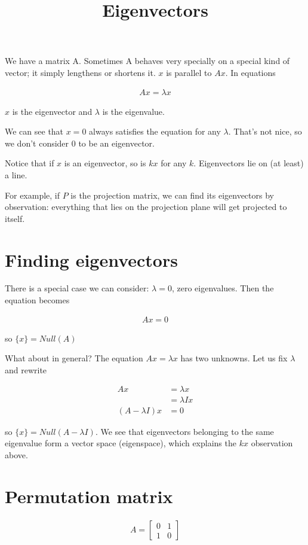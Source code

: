 \documentclass{article}
\title{Eigenvectors}
\date{}
\begin{document}
\maketitle

We have a matrix A. Sometimes A behaves very specially on a special kind of vector; it simply lengthens or shortens it. $x$ is parallel to $Ax$. In equations

\begin{align}
Ax = \lambda x
\end{align}

$x$ is the eigenvector and $\lambda$ is the eigenvalue.

We can see that $x=0$ always satisfies the equation for any $\lambda$. That's not nice, so we don't consider $0$ to be an eigenvector.

Notice that if $x$ is an eigenvector, so is $kx$ for any $k$. Eigenvectors lie on (at least) a line.

For example, if $P$ is the projection matrix, we can find its eigenvectors by observation: everything that lies on the projection plane will get projected to itself.

\section{Finding eigenvectors}

There is a special case we can consider: $\lambda = 0$, zero eigenvalues. Then the equation becomes

\begin{align}
Ax = 0
\end{align}

so $\{x\} = Null(A)$

What about in general? The equation $Ax = \lambda x$ has two unknowns. Let us fix $\lambda$ and rewrite

\begin{align}
Ax &= \lambda x \\
&= \lambda I x \\
(A-\lambda I) x &= 0
\end{align}

so $\{x\} = Null(A-\lambda I)$. We see that eigenvectors belonging to the same eigenvalue form a vector space (eigenspace), which explains the $kx$ observation above.

\section{Permutation matrix}
\begin{align}
A =
\begin{bmatrix} 
0 & 1 \\ 
1 & 0
\end{bmatrix}
\end{align}
\end{document}
